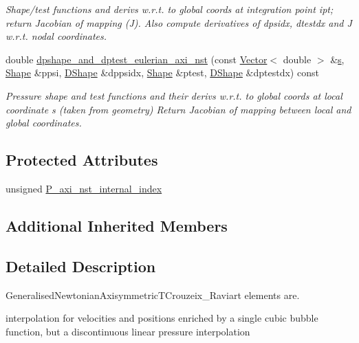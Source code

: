 \begin{DoxyCompactItemize}
\begin{DoxyCompactList}\small\item\em Shape/test functions and derivs w.\+r.\+t. to global coords at integration point ipt; return Jacobian of mapping (J). Also compute derivatives of dpsidx, dtestdx and J w.\+r.\+t. nodal coordinates. \end{DoxyCompactList}\item 
double \hyperlink{classoomph_1_1GeneralisedNewtonianAxisymmetricTCrouzeixRaviartElement_ade040ee5308d3d7eef9f8099023bec0d}{dpshape\+\_\+and\+\_\+dptest\+\_\+eulerian\+\_\+axi\+\_\+nst} (const \hyperlink{classoomph_1_1Vector}{Vector}$<$ double $>$ \&\hyperlink{cfortran_8h_ab7123126e4885ef647dd9c6e3807a21c}{s}, \hyperlink{classoomph_1_1Shape}{Shape} \&ppsi, \hyperlink{classoomph_1_1DShape}{D\+Shape} \&dppsidx, \hyperlink{classoomph_1_1Shape}{Shape} \&ptest, \hyperlink{classoomph_1_1DShape}{D\+Shape} \&dptestdx) const
\begin{DoxyCompactList}\small\item\em Pressure shape and test functions and their derivs w.\+r.\+t. to global coords at local coordinate s (taken from geometry) Return Jacobian of mapping between local and global coordinates. \end{DoxyCompactList}\end{DoxyCompactItemize}
\subsection*{Protected Attributes}
\begin{DoxyCompactItemize}
\item 
unsigned \hyperlink{classoomph_1_1GeneralisedNewtonianAxisymmetricTCrouzeixRaviartElement_aa6cb9966351b7d964fde3efec3932753}{P\+\_\+axi\+\_\+nst\+\_\+internal\+\_\+index}
\end{DoxyCompactItemize}
\subsection*{Additional Inherited Members}


\subsection{Detailed Description}
Generalised\+Newtonian\+Axisymmetric\+T\+Crouzeix\+\_\+\+Raviart elements are. 

interpolation for velocities and positions enriched by a single cubic bubble function, but a discontinuous linear pressure interpolation 

